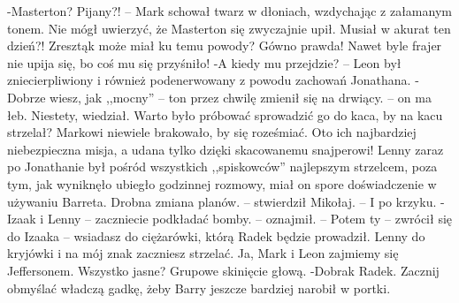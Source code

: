\documentclass[../MAIN.tex]{subfiles}
\begin{document}
-Masterton? Pijany?! -- Mark schował twarz w dłoniach, wzdychając z załamanym tonem. Nie mógł uwierzyć, że Masterton się zwyczajnie upił. Musiał w akurat ten dzień?! Zresztą\3k może miał ku temu powody? Gówno prawda! Nawet byle frajer nie upija się, bo coś mu się przyśniło!
-A kiedy mu przejdzie? -- Leon był zniecierpliwiony i również podenerwowany z powodu zachowań Jonathana.
-Dobrze wiesz, jak ,,mocny'' -- ton przez chwilę zmienił się na drwiący. -- on ma łeb.
Niestety, wiedział. Warto było próbować sprowadzić go do kaca, by na kacu strzelał? Markowi niewiele brakowało, by się roześmiać. Oto ich najbardziej niebezpieczna misja, a udana tylko dzięki skacowanemu snajperowi!
Lenny zaraz po Jonathanie był pośród wszystkich ,,spiskowców'' najlepszym strzelcem, poza tym, jak wyniknęło ubiegło godzinnej rozmowy, miał on spore doświadczenie w używaniu Barreta. Drobna zmiana planów. -- stwierdził Mikołaj. -- I po krzyku.
-Izaak i Lenny -- zaczniecie podkładać bomby. -- oznajmił. -- Potem ty -- zwrócił się do Izaaka -- wsiadasz do ciężarówki, którą Radek będzie prowadził. Lenny do kryjówki i na mój znak zaczniesz strzelać. Ja, Mark i Leon zajmiemy się Jeffersonem. Wszystko jasne?
Grupowe skinięcie głową.
-Dobra\3k Radek. Zacznij obmyślać władczą gadkę, żeby Barry jeszcze bardziej narobił w portki.
\end{document}
